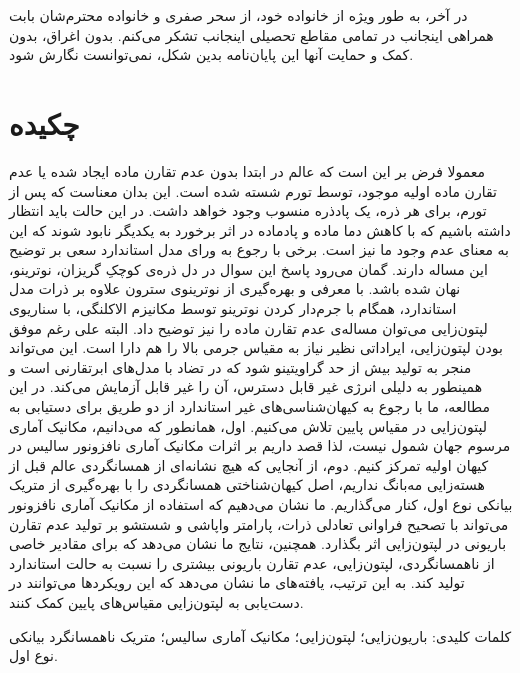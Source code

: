\documentclass[a4paper]{book}
\begin{document}
در آخر، به طور ویژه از خانواده خود، از سحر صفری و خانواده محترم‌شان بابت همراهی اینجانب در تمامی مقاطع تحصیلی اینجانب تشکر می‌کنم. بدون اغراق، بدون کمک و حمایت آنها این پایان‌نامه بدین شکل، نمی‌توانست نگارش شود.
	
\chapter*{چکیده}
{معمولا فرض بر این است که عالم در ابتدا بدون عدم تقارن ماده ایجاد شده یا عدم تقارن ماده اولیه موجود، توسط تورم شسته شده است. این بدان معناست که پس از تورم، برای هر ذره، یک پادذره منسوب وجود خواهد داشت. در این حالت باید انتظار داشته باشیم که با کاهش دما ماده و پادماده در اثر برخورد به یکدیگر نابود شوند که این به معنای عدم وجود ما نیز است. برخی با رجوع به ورای مدل استاندارد سعی بر توضیح این مساله دارند. گمان می‌رود پاسخ این سوال در دل ذره‌ی کوچکِ گریزان، نوترینو، نهان شده باشد. با معرفی و بهره‌گیری از نوترینو‌ی سترون علاوه بر ذرات مدل استاندارد، همگام با جرم‌دار کردن نوترینو توسط مکانیزم الاکلنگی، با سناریوی لپتون‌زایی می‌توان مساله‌ی عدم تقارن ماده را نیز توضیح داد. البته علی رغم موفق بودن لپتون‌زایی، ایراداتی نظیر نیاز به مقیاس جرمی بالا را هم دارا است. این می‌تواند منجر به تولید بیش از حد گراویتینو شود که در تضاد با مدل‌های ابرتقارنی است و همینطور به دلیلی انرژی غیر قابل دسترس، آن را غیر قابل آزمایش می‌کند.
	در این مطالعه، ما با رجوع به کیهان‌شناسی‌های غیر استاندارد از دو طریق برای دستیابی به لپتون‌زایی در مقیاس پایین تلاش می‌کنیم.
	اول، همانطور که می‌دانیم، مکانیک آماری مرسوم جهان شمول نیست، لذا قصد داریم بر اثرات مکانیک آماری نافزونور سالیس در کیهان اولیه تمرکز کنیم.
	دوم، از آنجایی که هیچ نشانه‌ای از همسانگردی عالم قبل از هسته‌زایی مه‌بانگ نداریم، اصل کیهان‌شناختی همسانگردی را با بهره‌گیری از متریک بیانکی نوع اول، کنار می‌گذاریم.
	ما نشان می‌دهیم که استفاده از مکانیک آماری نافزونور می‌تواند با تصحیح فراوانی تعادلی ذرات، پارامتر واپاشی و شستشو بر تولید عدم تقارن باریونی در لپتون‌زایی اثر بگذارد.
	همچنین، نتایج ما نشان می‌دهد که برای مقادیر خاصی از ناهمسانگردی، لپتون‌زایی، عدم تقارن باریونی بیشتری را نسبت به حالت استاندارد تولید کند.
	به این ترتیب، یافته‌های ما نشان می‌دهد که این رویکردها می‌توانند در دست‌یابی به لپتون‌زایی مقیاس‌های پایین کمک کنند. \par}
\vspace{0.5cm}
\noindent
کلمات کلیدی: باریون‌زایی؛ لپتون‌زایی؛ مکانیک آماری سالیس؛ متریک ناهمسانگرد بیانکی نوع اول.

\tableofcontents

\listoftables
\end{document}
